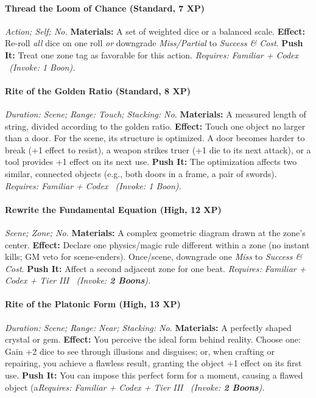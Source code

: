 \documentclass[12pt,twoside]{book}
\begin{document}
\paragraph{Thread the Loom of Chance (Standard, 7 XP)} \emph{Action; Self; No.}
\textbf{Materials:} A set of weighted dice or a balanced scale.
\textbf{Effect:} Re-roll \emph{all} dice on one roll \emph{or} downgrade \emph{Miss/Partial} to \emph{Success \& Cost}.
\textbf{Push It:} Treat one zone tag as favorable for this action.
\emph{Requires: Familiar + Codex \ (\textit{Invoke:} 1 Boon).}
\paragraph{Rite of the Golden Ratio (Standard, 8 XP)} \emph{Duration: Scene; Range: Touch; Stacking: No.}
\textbf{Materials:} A measured length of string, divided according to the golden ratio.
\textbf{Effect:} Touch one object no larger than a door. For the scene, its structure is optimized. A door becomes harder to break (+1 effect to resist), a weapon strikes truer (+1 die to its next attack), or a tool provides +1 effect on its next use.
\textbf{Push It:} The optimization affects two similar, connected objects (e.g., both doors in a frame, a pair of swords).
\emph{Requires: Familiar + Codex \ (\textit{Invoke:} 1 Boon).}
\paragraph{Rewrite the Fundamental Equation (High, 12 XP)} \emph{Scene; Zone; No.}
\textbf{Materials:} A complex geometric diagram drawn at the zone's center.
\textbf{Effect:} Declare one physics/magic rule different within a zone (no instant kills; GM veto for scene-enders). Once/scene, downgrade one \emph{Miss} to \emph{Success \& Cost}.
\textbf{Push It:} Affect a second adjacent zone for one beat.
\emph{Requires: Familiar + Codex + Tier III \ (\textit{Invoke:} \textbf{2 Boons}).}
\paragraph{Rite of the Platonic Form (High, 13 XP)} \emph{Duration: Scene; Range: Near; Stacking: No.}
\textbf{Materials:} A perfectly shaped crystal or gem.
\textbf{Effect:} You perceive the ideal form behind reality. Choose one: Gain +2 dice to see through illusions and disguises; or, when crafting or repairing, you achieve a flawless result, granting the object +1 effect on its first use.
\textbf{Push It:} You can impose this perfect form for a moment, causing a flawed object (a\emph{Requires: Familiar + Codex + Tier III \ (\textit{Invoke:} \textbf{2 Boons}).}
\end{document}
